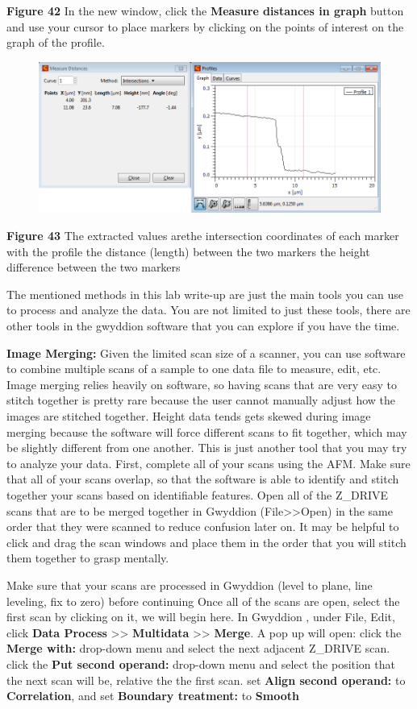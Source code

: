 \documentclass{../lab}
\begin{document}
\textbf{Figure 42}
In the new window, click the \textbf{Measure distances in graph} button  and use your cursor to place markers by clicking on the points of interest on the graph of the profile.

\begin{figure}[h]
    \centering
    \href{http://dev-physicsadv.pantheon.berkeley.edu/sites/default/files/AFMImages/51.png}{\includegraphics[width=0.5\linewidth]{images/51.png}}
    \caption{}
    \label{fig:51}
\end{figure}


\textbf{Figure 43}
The extracted values arethe intersection coordinates of each marker with the profile
the distance (length) between the two markers
the height difference between the two markers

The mentioned methods in this lab write-up are just the main tools you can use to process and analyze the data.  You are not limited to just these tools, there are other tools in the gwyddion software that you can explore if you have the time.

\textbf{Image Merging: }Given the limited scan size of a scanner, you can use software to combine multiple scans of a sample to one data file to measure, edit, etc.  Image merging relies heavily on software, so having scans that are very easy to stitch together is pretty rare because the user cannot manually adjust how the images are stitched together.  Height data tends gets skewed during image merging because the software will force different scans to fit together, which may be slightly different from one another.  This is just another tool that you may try to analyze your data.
First, complete all of your scans using the AFM.  Make sure that all of your scans overlap, so that the software is able to identify and stitch together your scans based on identifiable features.
Open all of the Z\_DRIVE scans that are to be merged together in Gwyddion (File>>Open) in the same order that they were scanned to reduce confusion later on.
It may be helpful to click and drag the scan windows and place them in the order that you will stitch them together to grasp mentally.

Make sure that your scans are processed in Gwyddion (level to plane, line leveling, fix to zero) before continuing
Once all of the scans are open, select the first scan by clicking on it, we will begin here.
In Gwyddion \textbf{}, under File, Edit, click \textbf{Data Process} >> \textbf{Multidata }>> \textbf{Merge}.
A pop up will open:
click the \textbf{Merge with:} drop-down menu and select the next adjacent Z\_DRIVE scan.
click the \textbf{Put second operand:} drop-down menu and select the position that the next scan will be, relative the the first scan.
set \textbf{Align second operand:} to \textbf{Correlation}, and set \textbf{Boundary treatment:} to \textbf{Smooth}
\end{document}
